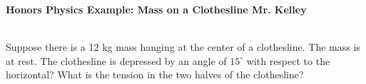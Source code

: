 \documentclass[12pt]{report}
\begin{document}
{\bf{Honors Physics} \hfill Example: Mass on a Clothesline \hfill {Mr. Kelley}} \\ \\

\vspace{1cm}

\hspace{1.5cm} \parbox{12 cm}{Suppose there is a 12 kg mass hanging at the center of a clothesline.  The mass is at rest.  The clothesline is depressed by an angle of $15^{\circ}$ with respect to the horizontal?  What is the tension in the two halves of the clothesline?}  \\
\vspace{1cm}

\hfill {} \hfill \mbox{} \\
\end{document}
